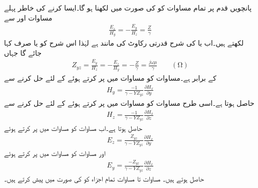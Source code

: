 پانچویں قدم پر تمام مساوات کو  کی صورت میں لکھنا ہو گا۔ایسا کرنے کی خاطر پہلے مساوات  اور  سے
\begin{align}\label{مساوات_میوج_ح}
\frac{E_z}{H_y}=-\frac{E_y}{H_z}=\frac{Z}{\gamma}
\end{align}
لکھتے ہیں۔اب  یا  کی شرح قدرتی رکاوٹ کی مانند ہے لہٰذا اس شرح کو   یا صرف  کہا جائے گا جہاں
\begin{align}\label{مساوات_میوج_خ}
Z_{yz}=\frac{E_y}{H_z}=-\frac{E_z}{H_y}=-\frac{Z}{\gamma}=\frac{j\omega \mu}{\gamma}  \quad \quad (\si{\ohm})
\end{align}
کے برابر ہے۔مساوات  کو مساوات  میں پر کرتے ہوئے  کے لئے حل کرنے سے
\begin{align}\label{مساوات_میوج_د}
H_y=\frac{-1}{\gamma-Y Z_{yz}} \frac{\partial H_x}{\partial y}
\end{align}
حاصل ہوتا ہے۔اسی طرح  مساوات  کو مساوات  میں پر کرتے ہوئے  کے لئے حل کرنے سے
\begin{align}\label{مساوات_میوج_ڈ}
H_z=\frac{-1}{\gamma-Y Z_{yz}} \frac{\partial H_x}{\partial z}
\end{align}
حاصل ہوتا ہے۔اب مساوات  کو مساوات  میں پر کرتے ہوئے
\begin{align}\label{مساوات_میوج_ذ}
E_z=\frac{Z_{yz}}{\gamma-Y Z_{yz}}\frac{\partial H_x}{\partial y}
\end{align}
اور مساوات  کو مساوات  میں پر کرتے ہوئے
\begin{align}\label{مساوات_میوج_ر}
E_y=\frac{-Z_{yz}}{\gamma-Y Z_{yz}}\frac{\partial H_x}{\partial z}
\end{align}
حاصل ہوتے ہیں۔ مساوات  تا مساوات  تمام اجزاء کو  کی صورت میں پیش کرتے ہیں۔ 

